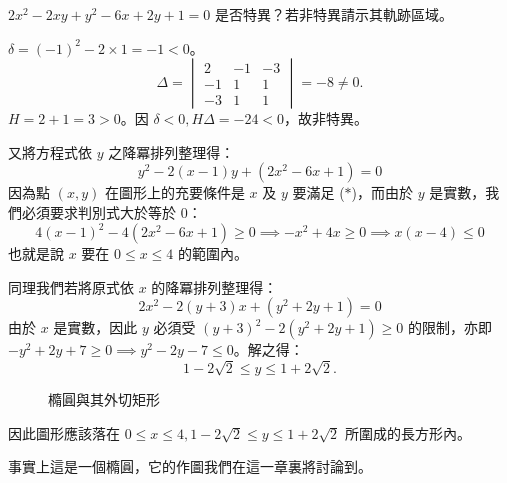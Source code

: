 \begin{example}
$2x^2 - 2xy + y^2 - 6x + 2y + 1 = 0$ 是否特異？若非特異請示其軌跡區域。
\end{example}

\begin{solution}
$\delta = (-1)^2 - 2 \times 1 = -1 < 0$。
\[
\Delta = \begin{vmatrix} 2 & -1 & -3 \\ -1 & 1 & 1 \\ -3 & 1 & 1 \end{vmatrix} = -8 \ne 0.
\]
$H = 2 + 1 = 3 > 0$。因 $\delta < 0, H\Delta = -24 < 0$，故非特異。

又將方程式依 $y$ 之降冪排列整理得：
\[
y^2 - 2(x - 1)y + (2x^2 - 6x + 1) = 0 \tag{$*$}
\]
因為點 $(x, y)$ 在圖形上的充要條件是 $x$ 及 $y$ 要滿足 ($*$)，而由於 $y$ 是實數，我們必須要求判別式大於等於 0：
\[
4(x - 1)^2 - 4(2x^2 - 6x + 1) \ge 0 \implies -x^2 + 4x \ge 0 \implies x(x - 4) \le 0
\]
也就是說 $x$ 要在 $0 \le x \le 4$ 的範圍內。

同理我們若將原式依 $x$ 的降冪排列整理得：
\[
2x^2 - 2(y + 3)x + (y^2 + 2y + 1) = 0
\]
由於 $x$ 是實數，因此 $y$ 必須受 $(y + 3)^2 - 2(y^2 + 2y + 1) \ge 0$ 的限制，亦即 $-y^2 + 2y + 7 \ge 0 \implies y^2 - 2y - 7 \le 0$。解之得：
\[
1 - 2\sqrt{2} \le y \le 1 + 2\sqrt{2}.
\]

\begin{figure}[htbp]
\centering
{}
\caption{橢圓與其外切矩形}
\label{fig:b4-ch4-fig1-6}
\end{figure}

因此圖形應該落在 $0 \le x \le 4, 1 - 2\sqrt{2} \le y \le 1 + 2\sqrt{2}$ 所圍成的長方形內。

事實上這是一個橢圓，它的作圖我們在這一章裏將討論到。
\end{solution}

